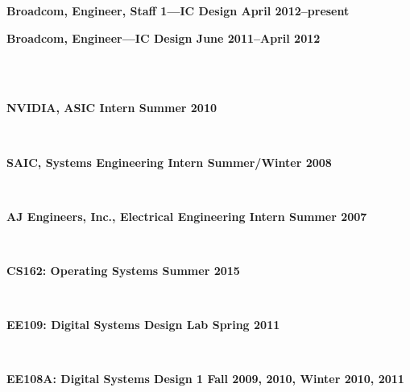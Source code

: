 \documentclass[10pt]{article} %
\begin{document}
\begin {minipage}[t]{0.2\linewidth}
\vspace{0pt}
\end {minipage}
\begin {minipage}[t]{0.8\linewidth}
\vspace{0pt}
\centerline {{\bf Broadcom, Engineer, Staff 1---IC Design \hfill April 2012--present}}
\centerline {{\bf Broadcom, Engineer---IC Design \hfill June 2011--April 2012}}
 \\

 \\
\centerline {\bf NVIDIA, ASIC Intern \hfill Summer 2010}
 \\

\centerline {\bf SAIC, Systems Engineering Intern \hfill Summer/Winter 2008}
 \\

\centerline {\bf AJ Engineers, Inc., Electrical Engineering Intern \hfill Summer 2007}
 \\

\end {minipage}

\begin {minipage}[t]{0.2\linewidth}
\vspace{0pt}
\end {minipage}
\begin {minipage}[t]{0.8\linewidth}
\vspace{0pt}
\centerline {{\bf CS162: Operating Systems \hfill Summer 2015}}
 \\

\end {minipage}

\begin {minipage}[t]{0.2\linewidth}
\vspace{0pt}
\end {minipage}
\begin {minipage}[t]{0.8\linewidth}
\vspace{0pt}
\centerline {{\bf EE109: Digital Systems Design Lab \hfill Spring 2011}}
 \\

\centerline {{\bf EE108A: Digital Systems Design 1 \hfill Fall 2009, 2010, Winter 2010, 2011}}
 \\
\end {minipage}
\end{document}
